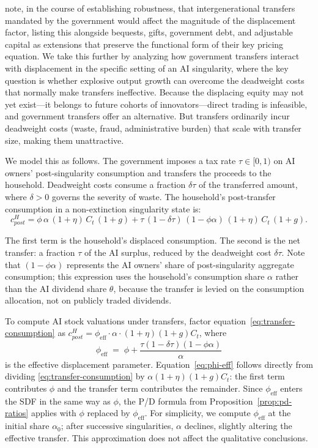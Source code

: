 \documentclass[12pt]{article}
\begin{document}
\citet{GKP2012} note, in the course of establishing robustness, that intergenerational transfers mandated by the government would affect the magnitude of the displacement factor, listing this alongside bequests, gifts, government debt, and adjustable capital as extensions that preserve the functional form of their key pricing equation. We take this further by analyzing how government transfers interact with displacement in the specific setting of an AI singularity, where the key question is whether explosive output growth can overcome the deadweight costs that normally make transfers ineffective. Because the displacing equity may not yet exist---it belongs to future cohorts of innovators---direct trading is infeasible, and government transfers offer an alternative. But transfers ordinarily incur deadweight costs (waste, fraud, administrative burden) that scale with transfer size, making them unattractive.

We model this as follows. The government imposes a tax rate $\tau \in [0,1)$ on AI owners' post-singularity consumption and transfers the proceeds to the household. Deadweight costs consume a fraction $\delta \tau$ of the transferred amount, where $\delta > 0$ governs the severity of waste. The household's post-transfer consumption in a non-extinction singularity state is:
%
\begin{equation}
c^H_{post} = \phi \, \alpha \, (1+\eta) \, C_t \, (1+g) + \tau \, (1 - \delta \tau) \, (1 - \phi\alpha) \, (1+\eta) \, C_t \, (1+g). \label{eq:transfer-consumption}
\end{equation}

The first term is the household's displaced consumption. The second is the net transfer: a fraction $\tau$ of the AI surplus, reduced by the deadweight cost $\delta \tau$. Note that $(1 - \phi\alpha)$ represents the AI owners' share of post-singularity aggregate consumption; this expression uses the household's consumption share $\alpha$ rather than the AI dividend share $\theta$, because the transfer is levied on the consumption allocation, not on publicly traded dividends.

To compute AI stock valuations under transfers, factor equation~\eqref{eq:transfer-consumption} as $c^H_{post} = \phi_\text{eff} \cdot \alpha \cdot (1+\eta)(1+g) C_t$, where
%
\begin{equation}
\phi_\text{eff} \;=\; \phi + \frac{\tau(1-\delta\tau)(1-\phi\alpha)}{\alpha} \label{eq:phi-eff}
\end{equation}
%
is the effective displacement parameter. Equation~\eqref{eq:phi-eff} follows directly from dividing \eqref{eq:transfer-consumption} by $\alpha(1+\eta)(1+g)C_t$: the first term contributes $\phi$ and the transfer term contributes the remainder. Since $\phi_\text{eff}$ enters the SDF in the same way as $\phi$, the P/D formula from Proposition~\ref{prop:pd-ratios} applies with $\phi$ replaced by $\phi_\text{eff}$. For simplicity, we compute $\phi_\text{eff}$ at the initial share $\alpha_0$; after successive singularities, $\alpha$ declines, slightly altering the effective transfer. This approximation does not affect the qualitative conclusions.
\end{document}
